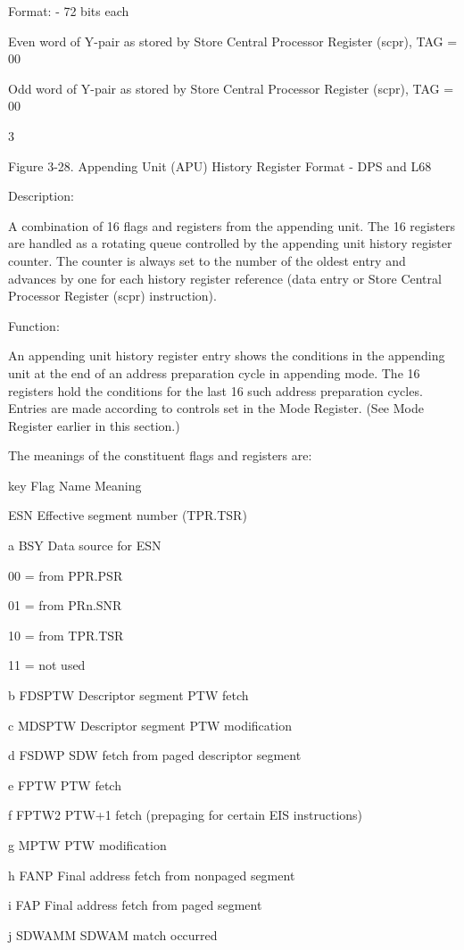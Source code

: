 Format: - 72 bits each

Even word of Y-pair as stored by Store Central Processor Register (scpr), TAG = 00

Odd word of Y-pair as stored by Store Central Processor Register (scpr), TAG = 00

3

Figure 3-28. Appending Unit (APU) History Register Format - DPS and L68

Description:

A combination of 16 flags and registers from the appending unit. The 16
registers are handled as a rotating queue controlled by the appending unit
history register counter. The counter is always set to the number of the oldest
entry and advances by one for each history register reference (data entry or
Store Central Processor Register (scpr) instruction).

Function:

An appending unit history register entry shows the conditions in the appending
unit at the end of an address preparation cycle in appending mode. The 16
registers hold the conditions for the last 16 such address preparation cycles.
Entries are made according to controls set in the Mode Register. (See Mode
Register earlier in this section.)

The meanings of the constituent flags and registers are:

key Flag Name Meaning

ESN Effective segment number (TPR.TSR)

a BSY Data source for ESN

00 = from PPR.PSR

01 = from PRn.SNR

10 = from TPR.TSR

11 = not used

b FDSPTW Descriptor segment PTW fetch

c MDSPTW Descriptor segment PTW modification

d FSDWP SDW fetch from paged descriptor segment

e FPTW PTW fetch

f FPTW2 PTW+1 fetch (prepaging for certain EIS instructions)

g MPTW PTW modification

h FANP Final address fetch from nonpaged segment

i FAP Final address fetch from paged segment

j SDWAMM SDWAM match occurred

